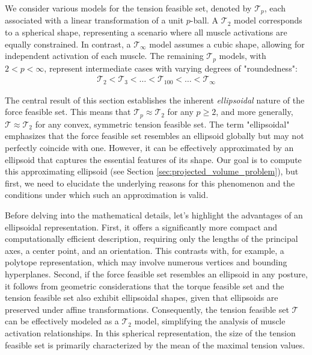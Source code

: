 We consider various models for the tension feasible set, denoted by $\mathcal{T}_p$, each associated with a linear transformation of a unit $p$-ball. A $\mathcal{T}_2$ model corresponds to a spherical shape, representing a scenario where all muscle activations are equally constrained. In contrast, a $\mathcal{T}_{\infty}$ model assumes a cubic shape, allowing for independent activation of each muscle. The remaining $\mathcal{T}_p$ models, with $2 < p < \infty$, represent intermediate cases with varying degrees of "roundedness":
\begin{align*}
\mathcal{T}_2 < \mathcal{T}_3 < \dots < \mathcal{T}_{100} < \dots < \mathcal{T}_{\infty}
\end{align*}

The central result of this section establishes the inherent \emph{ellipsoidal} nature of the force feasible set. This means that $\mathcal{T}_p \approx \mathcal{T}_2$ for any $p \geq 2$, and more generally, $\mathcal{T} \approx \mathcal{T}_2$ for any convex, symmetric tension feasible set. The term "ellipsoidal" emphasizes that the force feasible set resembles an ellipsoid globally but may not perfectly coincide with one. However, it can be effectively approximated by an ellipsoid that captures the essential features of its shape. Our goal is to compute this approximating ellipsoid (see Section \ref{sec:projected_volume_problem}), but first, we need to elucidate the underlying reasons for this phenomenon and the conditions under which such an approximation is valid.

Before delving into the mathematical details, let's highlight the advantages of an ellipsoidal representation. First, it offers a significantly more compact and computationally efficient description, requiring only the lengths of the principal axes, a center point, and an orientation. This contrasts with, for example, a polytope representation, which may involve numerous vertices and bounding hyperplanes. Second, if the force feasible set resembles an ellipsoid in any posture, it follows from geometric considerations that the torque feasible set and the tension feasible set also exhibit ellipsoidal shapes, given that ellipsoids are preserved under affine transformations. Consequently, the tension feasible set $\mathcal{T}$ can be effectively modeled as a $\mathcal{T}_2$ model, simplifying the analysis of muscle activation relationships. In this spherical representation, the size of the tension feasible set is primarily characterized by the mean of the maximal tension values.


